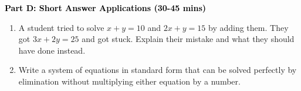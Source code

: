 \documentclass[12pt, letterpaper, fleqn]{article}
\begin{document}
\newpage

\begin{tcolorbox}[colback=customteal!20]
\large\textcolor{black}{\textbf{Part D: Short Answer Applications (30-45 mins)}}
\end{tcolorbox}

\vspace{3mm}

\begin{enumerate}[itemsep=4.2cm, leftmargin=0.6cm, resume]
\item A student tried to solve $x + y = 10$ and $2x + y = 15$ by adding them. They got $3x + 2y = 25$ and got stuck. Explain their mistake and what they should have done instead.
\item Write a system of equations in standard form that can be solved perfectly by elimination without multiplying either equation by a number.
\end{enumerate}
\end{document}
